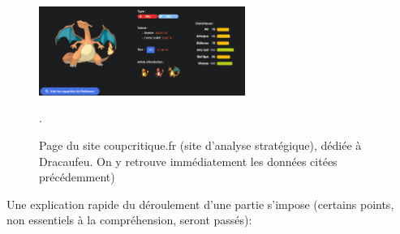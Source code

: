 \documentclass[a4paper,12pt]{article}
\begin{document}
\begin{figure}[!h]
    \centering
    \includegraphics[width=0.6\textwidth]{Image/dracaufeu_coup_critique.png}
    \caption{Page du site coupcritique.fr (site d'analyse stratégique), dédiée à
    Dracaufeu. On y retrouve immédiatement les données citées précédemment)}.
    \label{fig:image1}
\end{figure}

Une explication rapide du déroulement d'une partie s'impose (certains points,
non essentiels à la compréhension, seront passés):
\end{document}

